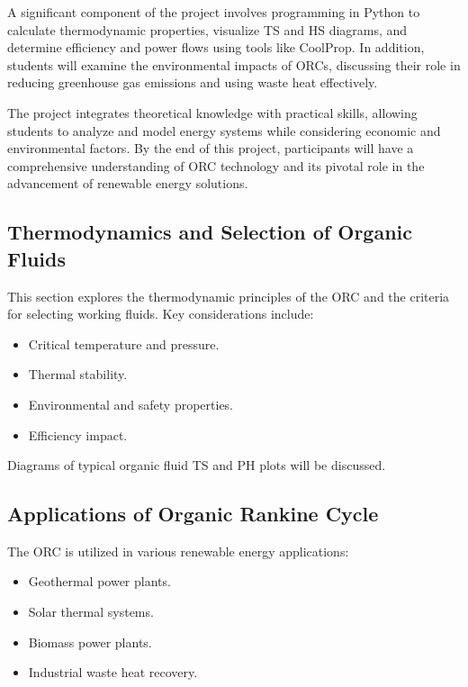 \documentclass[letterpaper,10pt,english]{jupyterBook}
\begin{document}
\sphinxAtStartPar
A significant component of the project involves programming in Python to
calculate thermodynamic properties, visualize T\sphinxhyphen{}S and H\sphinxhyphen{}S diagrams, and
determine efficiency and power flows using tools like CoolProp. In
addition, students will examine the environmental impacts of ORCs,
discussing their role in reducing greenhouse gas emissions and using
waste heat effectively.

\sphinxAtStartPar
The project integrates theoretical knowledge with practical skills,
allowing students to analyze and model energy systems while considering
economic and environmental factors. By the end of this project,
participants will have a comprehensive understanding of ORC technology
and its pivotal role in the advancement of renewable energy solutions.


\subsection{Thermodynamics and Selection of Organic Fluids}
\label{\detokenize{ProjectInstructions:thermodynamics-and-selection-of-organic-fluids}}
\sphinxAtStartPar
This section explores the thermodynamic principles of the ORC and the
criteria for selecting working fluids. Key considerations include:
\begin{itemize}
\item {} 
\sphinxAtStartPar
Critical temperature and pressure.

\item {} 
\sphinxAtStartPar
Thermal stability.

\item {} 
\sphinxAtStartPar
Environmental and safety properties.

\item {} 
\sphinxAtStartPar
Efficiency impact.

\end{itemize}

\sphinxAtStartPar
Diagrams of typical organic fluid T\sphinxhyphen{}S and P\sphinxhyphen{}H plots will be discussed.


\subsection{Applications of Organic Rankine Cycle}
\label{\detokenize{ProjectInstructions:applications-of-organic-rankine-cycle}}
\sphinxAtStartPar
The ORC is utilized in various renewable energy applications:
\begin{itemize}
\item {} 
\sphinxAtStartPar
Geothermal power plants.

\item {} 
\sphinxAtStartPar
Solar thermal systems.

\item {} 
\sphinxAtStartPar
Biomass power plants.

\item {} 
\sphinxAtStartPar
Industrial waste heat recovery.

\end{itemize}
\end{document}
